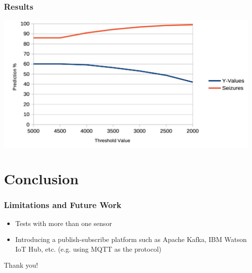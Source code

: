\documentclass[xelatex,usenames,dvipsnames]{beamer}
\begin{document}
  \begin{frame}[standout]
    \frametitle{Results}
  
    \includegraphics[width = \textwidth]{figs/Threshold.png}
    
  
  \end{frame}


  \section{Conclusion}
  \begin{frame}
    \frametitle{Limitations and Future Work}
    \begin{itemize}
      \item Tests with more than one sensor
      \item Introducing a publish-subscribe platform such as Apache Kafka, IBM Watson IoT Hub, etc. (e.g. using MQTT as the protocol)
    \end{itemize}
    
  
  \end{frame}







  \begin{frame}[standout]
    Thank you!
  \end{frame}


\end{document}
